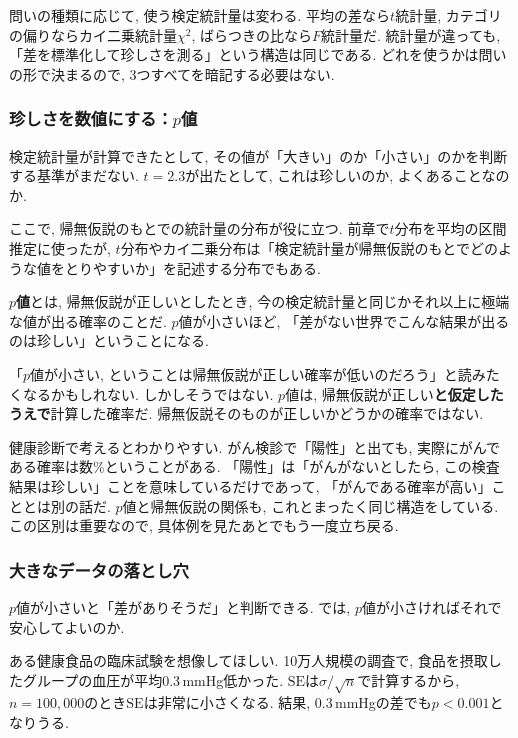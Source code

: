     問いの種類に応じて, 使う検定統計量は変わる.
    平均の差なら$t$統計量, カテゴリの偏りならカイ二乗統計量$\chi^2$, ばらつきの比なら$F$統計量だ.
    統計量が違っても, 「差を標準化して珍しさを測る」という構造は同じである.
    どれを使うかは問いの形で決まるので, 3つすべてを暗記する必要はない.

    \subsubsection*{珍しさを数値にする：$p$値}

    検定統計量が計算できたとして, その値が「大きい」のか「小さい」のかを判断する基準がまだない.
    $t = 2.3$が出たとして, これは珍しいのか, よくあることなのか.

    ここで, 帰無仮説のもとでの統計量の分布が役に立つ.
    前章で$t$分布を平均の区間推定に使ったが, $t$分布やカイ二乗分布は「検定統計量が帰無仮説のもとでどのような値をとりやすいか」を記述する分布でもある.

    \textbf{$p$値}とは, 帰無仮説が正しいとしたとき, 今の検定統計量と同じかそれ以上に極端な値が出る確率のことだ.
    $p$値が小さいほど, 「差がない世界でこんな結果が出るのは珍しい」ということになる.

    「$p$値が小さい, ということは帰無仮説が正しい確率が低いのだろう」と読みたくなるかもしれない.
    しかしそうではない.
    $p$値は, 帰無仮説が正しい\textbf{と仮定したうえで}計算した確率だ.
    帰無仮説そのものが正しいかどうかの確率ではない.

    健康診断で考えるとわかりやすい.
    がん検診で「陽性」と出ても, 実際にがんである確率は数\%ということがある.
    「陽性」は「がんがないとしたら, この検査結果は珍しい」ことを意味しているだけであって,
    「がんである確率が高い」こととは別の話だ.
    $p$値と帰無仮説の関係も, これとまったく同じ構造をしている.
    この区別は重要なので, 具体例を見たあとでもう一度立ち戻る.

    \subsubsection*{大きなデータの落とし穴}

    $p$値が小さいと「差がありそうだ」と判断できる.
    では, $p$値が小さければそれで安心してよいのか.

    ある健康食品の臨床試験を想像してほしい.
    10万人規模の調査で, 食品を摂取したグループの血圧が平均0.3\,mmHg低かった.
    $\mathrm{SE}$は$\sigma / \sqrt{n}$で計算するから, $n = 100{,}000$のとき$\mathrm{SE}$は非常に小さくなる.
    結果, 0.3\,mmHgの差でも$p < 0.001$となりうる.

